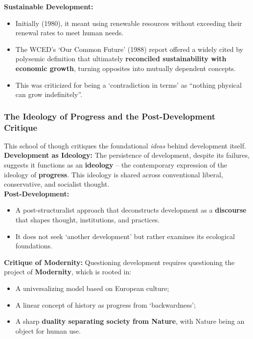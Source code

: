 \documentclass{article}
\begin{document}
    \noindent \textbf{Sustainable Development:}
    \begin{itemize}
        \item Initially (1980), it meant using renewable resources without
        exceeding their renewal rates to meet human needs.
        \item The WCED's `Our Common Future' (1988) report offered a widely
        cited by polysemic definition that ultimately
        \textbf{reconciled sustainability with economic growth}, turning
        opposites into mutually dependent concepts.
        \item This was criticized for being a `contradiction in terms' as
        ``nothing physical can grow indefinitely''.
    \end{itemize}

    \subsubsection{The Ideology of Progress and the Post-Development Critique}

    \noindent This school of though critiques the foundational
\textit{ideas} behind development itself.\\

    \noindent \textbf{Development as Ideology:} The persistence of
development, despite its failures, suggests it functions as an
\textbf{ideology} -- the contemporary expression of the ideology of
\textbf{progress}. This ideology is shared across conventional liberal,
conservative, and socialist thought.\\

    \noindent \textbf{Post-Development:}
    \begin{itemize}
        \item A post-structuralist approach that deconstructs development
        as a \textbf{discourse} that shapes thought, institutions, and
        practices.
        \item It does not seek `another development' but rather examines its
        ecological foundations.
    \end{itemize}

    \noindent \textbf{Critique of Modernity:} Questioning development
requires questioning the project of \textbf{Modernity}, which is rooted in:
    \begin{itemize}
        \item A universalizing model based on European culture;
        \item A linear concept of history as progress from `backwardness';
        \item A sharp \textbf{duality separating society from Nature}, with
        Nature being an object for human use.
    \end{itemize}
\end{document}
